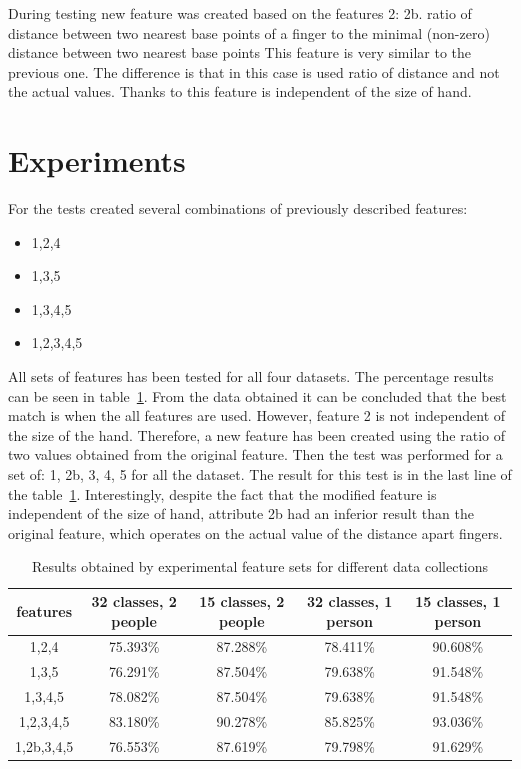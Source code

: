 During testing new feature was created based on the features 2:\newline
2b. ratio of distance between two nearest base points of a finger to the minimal (non-zero) distance between two nearest base points
This feature is very similar to the previous one. The difference is that in this case is used ratio of distance and not the actual values. Thanks to this feature is independent of the size of hand.

\section{Experiments}
For the tests created several combinations of previously described features:
\begin{itemize}
\item 1,2,4
\item 1,3,5
\item 1,3,4,5
\item 1,2,3,4,5
\end{itemize}

All sets of features has been tested for all four datasets. The percentage results can be seen in table~\ref{findiff}. From the data obtained it can be concluded that the best match is when the all features are used. However, feature 2 is not independent of the size of the hand. Therefore, a new feature has been created using the ratio of two values obtained from the original feature. Then the test was performed for a set of: 1, 2b, 3, 4, 5 for all the dataset. The result for this test is in the last line of the table~\ref{findiff}. Interestingly, despite the fact that the modified feature is independent of the size of hand, attribute 2b had an inferior result than the original feature, which operates on the actual value of the distance apart fingers. 

\begin{table}[htp!]
\begin{center}
	\label{findiff}
	\caption{Results obtained by experimental feature sets for different data collections}
    \begin{tabular}{|c|c|c|c|c|}
    \hline
    features & 32 classes, 2 people & 15 classes, 2 people & 32 classes, 1 person  & 15 classes, 1 person  \\ \hline
    1,2,4		& 75.393\% & 87.288\%  & 78.411\% & 90.608\% \\ \hline
    1,3,5              	& 76.291\% & 87.504\%  & 79.638\% & 91.548\% \\ \hline
    1,3,4,5            	& 78.082\% & 87.504\%  & 79.638\% & 91.548\% \\ \hline
    1,2,3,4,5           & 83.180\% & 90.278\%  & 85.825\% & 93.036\% \\ \hline
    1,2b,3,4,5          & 76.553\% & 87.619\%  & 79.798\% & 91.629\% \\ \hline
    \end{tabular}
    \end{center}
\end{table}

